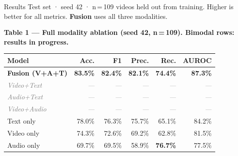 \begin{minipage}[t]{0.465\textwidth}

  \begin{pbox}{Results}
    {\large\color{gray}
     Test set · seed 42 · n\,=\,109 videos held out from training.
     Higher is better for all metrics.
     \colorbox{fusionrow}{\textcolor{epflred}{\bfseries Fusion}}
     uses all three modalities.}

    \vspace{5mm}
    {\Large\bfseries Table 1 --- Full modality ablation (seed 42, n\,=\,109).
    Bimodal rows: results in progress.}\\[3mm]

    \renewcommand{\arraystretch}{1.4}
    {\large
    \begin{tabular}{lrrrrr}
      \toprule
      \textbf{Model}
        & \textbf{Acc.} & \textbf{F1}
        & \textbf{Prec.} & \textbf{Rec.} & \textbf{AUROC} \\
      \midrule
      \rowcolor{fusionrow}
      \textbf{\textcolor{epflred}{Fusion (V+A+T)}}
        & \textbf{\textcolor{epflred}{83.5\%}}
        & \textbf{\textcolor{epflred}{82.4\%}}
        & \textbf{\textcolor{epflred}{82.1\%}}
        & \textbf{\textcolor{epflred}{74.4\%}}
        & \textbf{\textcolor{epflred}{87.3\%}} \\
      \rowcolor{birow}
      \textit{\textcolor{gray}{Video+Text}}
        & \textit{\textcolor{gray}{---}}
        & \textit{\textcolor{gray}{---}}
        & \textit{\textcolor{gray}{---}}
        & \textit{\textcolor{gray}{---}}
        & \textit{\textcolor{gray}{---}} \\
      \rowcolor{birow}
      \textit{\textcolor{gray}{Audio+Text}}
        & \textit{\textcolor{gray}{---}}
        & \textit{\textcolor{gray}{---}}
        & \textit{\textcolor{gray}{---}}
        & \textit{\textcolor{gray}{---}}
        & \textit{\textcolor{gray}{---}} \\
      \rowcolor{birow}
      \textit{\textcolor{gray}{Video+Audio}}
        & \textit{\textcolor{gray}{---}}
        & \textit{\textcolor{gray}{---}}
        & \textit{\textcolor{gray}{---}}
        & \textit{\textcolor{gray}{---}}
        & \textit{\textcolor{gray}{---}} \\
      Text only  & 78.0\% & 76.3\% & 75.7\% & 65.1\% & 84.2\% \\
      Video only & 74.3\% & 72.6\% & 69.2\% & 62.8\% & 81.5\% \\
      Audio only & 69.7\% & 69.5\% & 58.9\%
                 & \textbf{76.7\%} & 77.5\% \\
      \bottomrule
    \end{tabular}}


\end{pbox}
\end{minipage}
